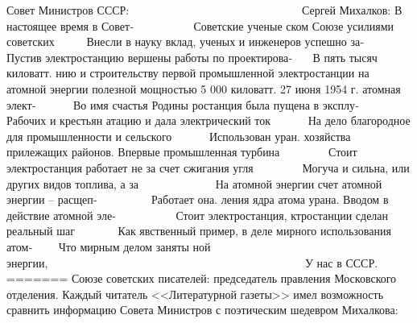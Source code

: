 \documentclass{book}
\begin{document}
Совет Министров СССР:                               Сергей Михалков:
В настоящее время в Совет‑           Советские ученые
ском Союзе усилиями советских      Внесли в науку вклад,
ученых и инженеров успешно за‑      Пустив электростанцию
вершены работы по проектирова‑    В пять тысяч киловатт.
нию и строительству первой
промышленной электростанции
на атомной энергии полезной
мощностью 5 000 киловатт.
27 июня 1954 г. атомная элект‑       Во имя счастья Родины
ростанция была пущена в эксплу‑       Рабочих и крестьян
атацию и дала электрический ток       На дело благородное
для промышленности и сельского       Использован уран.
хозяйства прилежащих районов.
Впервые промышленная турбина         Стоит электростанция
работает не за счет сжигания угля         Могуча и сильна,
или других видов топлива, а за              На атомной энергии
счет атомной энергии -- расщеп‑          Работает она.
ления ядра атома урана.
Вводом в действие атомной эле‑           Стоит электростанция,
ктростанции сделан реальный шаг        Как явственный пример,
в деле мирного использования атом‑     Что мирным делом заняты
ной энергии,                                              У нас в СССР.
=======
Союзе советских писателей: председатель правления Московского отделения. Каждый читатель <<Литературной газеты>> имел возможность сравнить информацию Совета Министров с поэтическим шедевром Михалкова:
\end{document}

